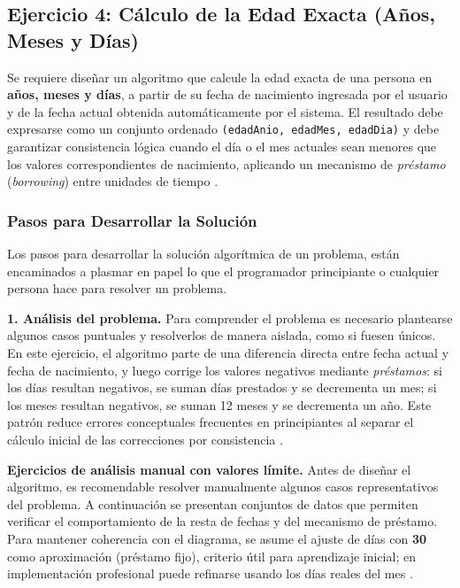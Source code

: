 \documentclass[12pt,twoside]{book}
\begin{document}
				\subsection{Ejercicio 4: Cálculo de la Edad Exacta (Años, Meses y Días)}
					\noindent
					Se requiere diseñar un algoritmo que calcule la edad exacta de una persona en \textbf{años, meses y días}, a partir de su fecha de nacimiento ingresada por el usuario y de la fecha actual obtenida automáticamente por el sistema. El resultado debe expresarse como un conjunto ordenado \texttt{(edadAnio, edadMes, edadDia)} y debe garantizar consistencia lógica cuando el día o el mes actuales sean menores que los valores correspondientes de nacimiento, aplicando un mecanismo de \emph{préstamo} (\textit{borrowing}) entre unidades de tiempo \cite{Sebesta2018Concepts,Pierce2002Types}.
					
					\subsubsection{Pasos para Desarrollar la Solución}
						Los pasos para desarrollar la solución algorítmica de un problema, están encaminados a plasmar en papel lo que el programador principiante o cualquier persona hace para resolver un problema.
						
						\textbf{1. Análisis del problema.} Para comprender el problema es necesario plantearse algunos casos puntuales y resolverlos de manera aislada, como si fuesen únicos. En este ejercicio, el algoritmo parte de una diferencia directa entre fecha actual y fecha de nacimiento, y luego corrige los valores negativos mediante \emph{préstamos}: si los días resultan negativos, se suman días prestados y se decrementa un mes; si los meses resultan negativos, se suman 12 meses y se decrementa un año. Este patrón reduce errores conceptuales frecuentes en principiantes al separar el cálculo inicial de las correcciones por consistencia \cite{Qian2018Students,Robins2003Learning,Lister2004Learning}.
						
						\textbf{Ejercicios de análisis manual con valores límite.}
						Antes de diseñar el algoritmo, es recomendable resolver manualmente algunos casos representativos del problema. A continuación se presentan conjuntos de datos que permiten verificar el comportamiento de la resta de fechas y del mecanismo de préstamo. Para mantener coherencia con el diagrama, se asume el ajuste de días con \textbf{30} como aproximación (préstamo fijo), criterio útil para aprendizaje inicial; en implementación profesional puede refinarse usando los días reales del mes \cite{Pressman2019Software,Sommerville2015Software}.
						
\end{document}
